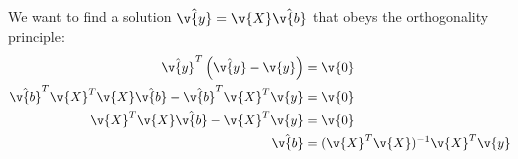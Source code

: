 \subsection{}
We want to find a solution $\hat{\v{y}}=\v{X}\hat{\v{b}}$ that obeys the orthogonality principle:
\begin{align}
	\hat{\v{y}}^T\left(\hat{\v{y}}-\v{y}\right)&=\v{0}\\
	\hat{\v{b}}^T\v{X}^T\v{X}\hat{\v{b}}-\hat{\v{b}}^T\v{X}^T\v{y}&=\v{0}\\
	\v{X}^T\v{X}\hat{\v{b}}-\v{X}^T\v{y}&=\v{0}\\
	\hat{\v{b}} &= (\v{X}^T\v{X})^{-1}\v{X}^T\v{y}
\end{align}



